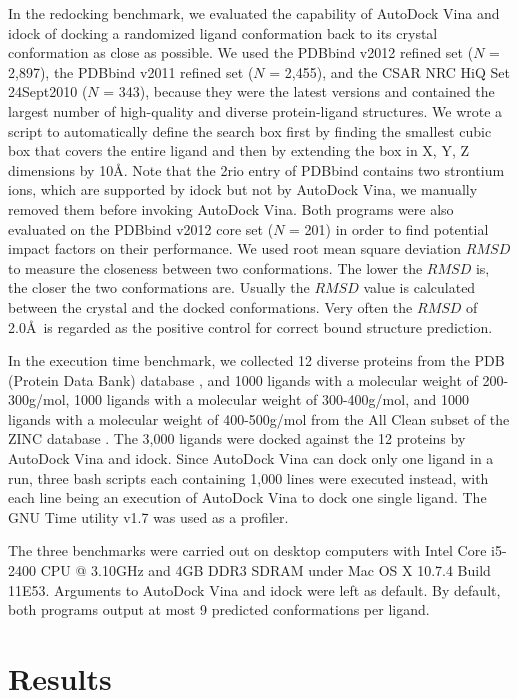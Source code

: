 In the redocking benchmark, we evaluated the capability of AutoDock Vina and idock of docking a randomized ligand conformation back to its crystal conformation as close as possible. We used the PDBbind v2012 refined set ($N$ = 2,897), the PDBbind v2011 refined set ($N$ = 2,455), and the CSAR NRC HiQ Set 24Sept2010 ($N$ = 343), because they were the latest versions and contained the largest number of high-quality and diverse protein-ligand structures. We wrote a script to automatically define the search box first by finding the smallest cubic box that covers the entire ligand and then by extending the box in X, Y, Z dimensions by 10\AA. Note that the 2rio entry of PDBbind contains two strontium ions, which are supported by idock but not by AutoDock Vina, we manually removed them before invoking AutoDock Vina. Both programs were also evaluated on the PDBbind v2012 core set ($N$ = 201) in order to find potential impact factors on their performance. We used root mean square deviation $RMSD$ to measure the closeness between two conformations. The lower the $RMSD$ is, the closer the two conformations are. Usually the $RMSD$ value is calculated between the crystal and the docked conformations. Very often the $RMSD$ of 2.0\AA\ is regarded as the positive control for correct bound structure prediction. 

In the execution time benchmark, we collected 12 diverse proteins from the PDB (Protein Data Bank) database \citep{540,537}, and 1000 ligands with a molecular weight of 200-300g/mol, 1000 ligands with a molecular weight of 300-400g/mol, and 1000 ligands with a molecular weight of 400-500g/mol from the All Clean subset of the ZINC database \citep{532,1178}. The 3,000 ligands were docked against the 12 proteins by AutoDock Vina and idock. Since AutoDock Vina can dock only one ligand in a run, three bash scripts each containing 1,000 lines were executed instead, with each line being an execution of AutoDock Vina to dock one single ligand. The GNU Time utility v1.7 was used as a profiler.

The three benchmarks were carried out on desktop computers with Intel Core i5-2400 CPU @ 3.10GHz and 4GB DDR3 SDRAM under Mac OS X 10.7.4 Build 11E53. Arguments to AutoDock Vina and idock were left as default. By default, both programs output at most 9 predicted conformations per ligand.

\section{Results}

